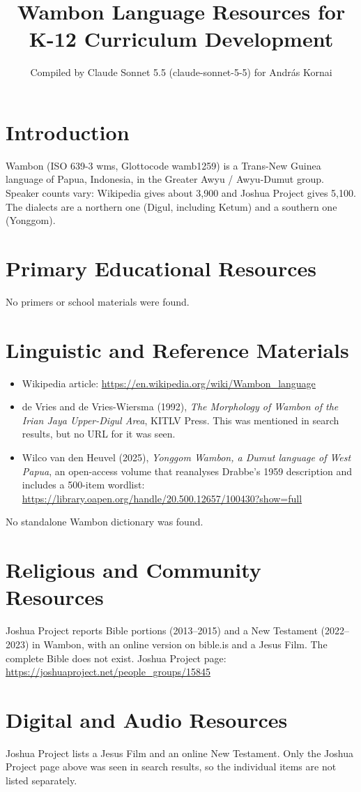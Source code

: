 \documentclass[12pt]{article}
\title{Wambon Language Resources for K-12 Curriculum Development}
\author{Compiled by Claude Sonnet 5.5 (claude-sonnet-5-5) for Andr\'as Kornai}
\date{}
\begin{document}
\maketitle

\section{Introduction}
Wambon (ISO 639-3 wms, Glottocode wamb1259) is a Trans-New Guinea language of Papua, Indonesia, in the Greater Awyu / Awyu-Dumut group. Speaker counts vary: Wikipedia gives about 3,900 and Joshua Project gives 5,100. The dialects are a northern one (Digul, including Ketum) and a southern one (Yonggom).

\section{Primary Educational Resources}
No primers or school materials were found.

\section{Linguistic and Reference Materials}
\begin{itemize}
\item Wikipedia article: \url{https://en.wikipedia.org/wiki/Wambon_language}
\item de Vries and de Vries-Wiersma (1992), \emph{The Morphology of Wambon of the Irian Jaya Upper-Digul Area}, KITLV Press. This was mentioned in search results, but no URL for it was seen.
\item Wilco van den Heuvel (2025), \emph{Yonggom Wambon, a Dumut language of West Papua}, an open-access volume that reanalyses Drabbe's 1959 description and includes a 500-item wordlist: \url{https://library.oapen.org/handle/20.500.12657/100430?show=full}
\end{itemize}
No standalone Wambon dictionary was found.

\section{Religious and Community Resources}
Joshua Project reports Bible portions (2013--2015) and a New Testament (2022--2023) in Wambon, with an online version on bible.is and a Jesus Film. The complete Bible does not exist. Joshua Project page: \url{https://joshuaproject.net/people_groups/15845}

\section{Digital and Audio Resources}
Joshua Project lists a Jesus Film and an online New Testament. Only the Joshua Project page above was seen in search results, so the individual items are not listed separately.
\end{document}

